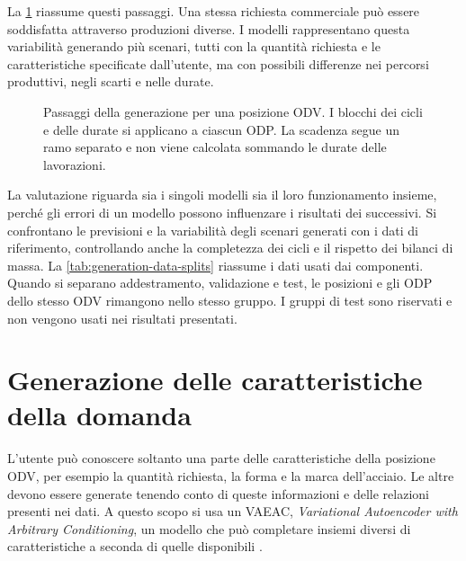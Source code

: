 La \cref{fig:production-generation-overview} riassume questi passaggi. Una stessa richiesta commerciale può essere soddisfatta attraverso produzioni diverse. I modelli rappresentano questa variabilità generando più scenari, tutti con la quantità richiesta e le caratteristiche specificate dall'utente, ma con possibili differenze nei percorsi produttivi, negli scarti e nelle durate.

\begin{figure}[H]
\centering
\reportfigurecontent{}
\caption{Passaggi della generazione per una posizione ODV. I blocchi dei cicli e delle durate si applicano a ciascun ODP. La scadenza segue un ramo separato e non viene calcolata sommando le durate delle lavorazioni.}
\label{fig:production-generation-overview}
\end{figure}

La valutazione riguarda sia i singoli modelli sia il loro funzionamento insieme, perché gli errori di un modello possono influenzare i risultati dei successivi. Si confrontano le previsioni e la variabilità degli scenari generati con i dati di riferimento, controllando anche la completezza dei cicli e il rispetto dei bilanci di massa. La \cref{tab:generation-data-splits} riassume i dati usati dai componenti. Quando si separano addestramento, validazione e test, le posizioni e gli ODP dello stesso ODV rimangono nello stesso gruppo. I gruppi di test sono riservati e non vengono usati nei risultati presentati.



\section{Generazione delle caratteristiche della domanda}
\label{sec:demand-feature-generation}

L'utente può conoscere soltanto una parte delle caratteristiche della posizione ODV, per esempio la quantità richiesta, la forma e la marca dell'acciaio. Le altre devono essere generate tenendo conto di queste informazioni e delle relazioni presenti nei dati. A questo scopo si usa un VAEAC, \emph{Variational Autoencoder with Arbitrary Conditioning}, un modello che può completare insiemi diversi di caratteristiche a seconda di quelle disponibili \parencite{ivanov2019vaeac}.

